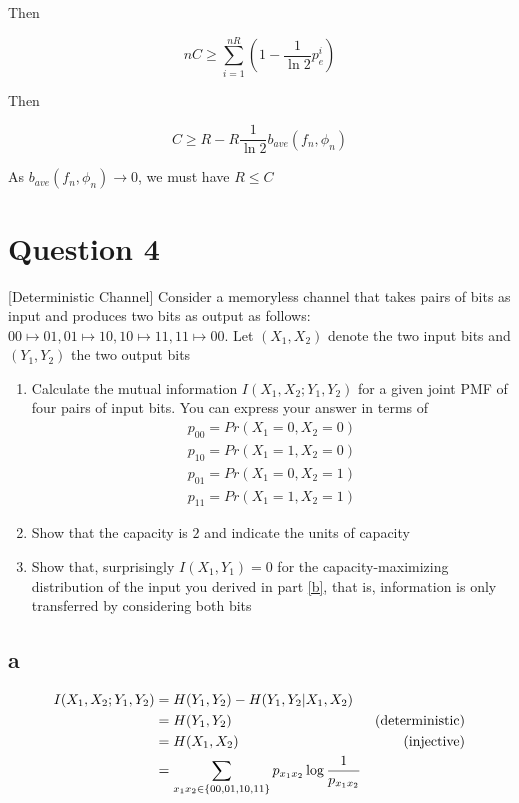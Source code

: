 \documentclass{article}
\begin{document}
Then

$$
    nC \geq \sum_{i=1}^{nR} (1 - \frac{1}{\ln 2} p_e^i) 
$$

Then

$$
    C \geq R - R \frac{1}{\ln 2} b_{ave}(f_n, \phi_n)
$$

As $b_{ave}(f_n, \phi_n) \to 0$, we must have $R \leq C$

\section{Question 4} 

[Deterministic Channel] Consider a memoryless channel that takes pairs of bits as input and produces two bits as output as follows: $00 \mapsto 01, 01 \mapsto 10, 10 \mapsto 11, 11 \mapsto 00$. Let $(X_1, X_2)$ denote the two input bits and $(Y_1, Y_2)$ the two output bits

\begin{enumerate}[label=(\alph*)]
    \item Calculate the mutual information $I(X_1, X_2; Y_1, Y_2)$ for a given joint PMF of four pairs of input bits. You can express your answer in terms of
    \begin{align*}
        p_{00} = Pr(X_1 = 0, X_2 = 0) \\
        p_{10} = Pr(X_1 = 1, X_2 = 0) \\
        p_{01} = Pr(X_1 = 0, X_2 = 1) \\
        p_{11} = Pr(X_1 = 1, X_2 = 1)
    \end{align*}

    \item \label{b} Show that the capacity is $2$ and indicate the units of capacity

    \item Show that, surprisingly $I(X_1, Y_1) = 0$ for the capacity-maximizing distribution of the input you derived in part \ref{b}, that is, information is only transferred by considering both bits
\end{enumerate}

\subsection{a}
\begin{align*}
    I(X_1, X_2; Y_1, Y_2)
    &= H(Y_1, Y_2) - H(Y_1, Y_2 | X_1, X_2) \\
    &= H(Y_1, Y_2) &\text{(deterministic)} \\
    &= H(X_1, X_2) &\text{(injective)} \\
    &= \sum_{x_1 x_2 \in \{00, 01, 10, 11\}} p_{x_1 x_2} \log \frac{1}{p_{x_1 x_2}}
\end{align*}
\end{document}
